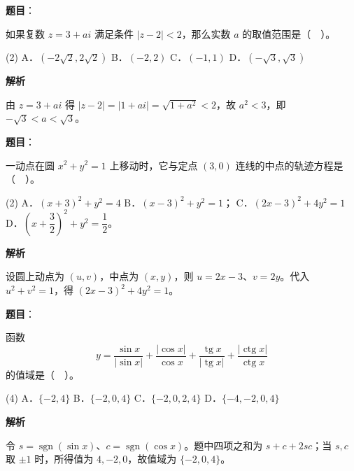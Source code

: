 \begin{answer}

\textbf{题目}：

如果复数 $z=3+ai$ 满足条件 $|z-2|<2$，那么实数 $a$ 的取值范围是（　）。

\begin{gkopts}(2)
\task A．$(-2\sqrt2,2\sqrt2)$
\task B．$(-2,2)$
\task C．$(-1,1)$
\task D．$(-\sqrt3,\sqrt3)$
\end{gkopts}

\textbf{解析}

由 $z=3+ai$ 得 $|z-2|=|1+ai|=\sqrt{1+a^2}<2$，故 $a^2<3$，即 $-\sqrt3<a<\sqrt3$。


\end{answer}
\begin{answer}

\textbf{题目}：

一动点在圆 $x^2+y^2=1$ 上移动时，它与定点 $(3,0)$ 连线的中点的轨迹方程是（　）。

\begin{gkopts}(2)
\task A．$(x+3)^2+y^2=4$
\task B．$(x-3)^2+y^2=1$；
\task C．$(2x-3)^2+4y^2=1$
\task D．$\left(x+\dfrac32\right)^2+y^2=\dfrac12$。
\end{gkopts}

\textbf{解析}

设圆上动点为 $(u,v)$，中点为 $(x,y)$，则 $u=2x-3$、$v=2y$。代入 $u^2+v^2=1$，得 $(2x-3)^2+4y^2=1$。


\end{answer}
\begin{answer}

\textbf{题目}：

函数
\nopagebreak[4]
\[
y=\frac{\sin x}{|\sin x|}+\frac{|\cos x|}{\cos x}+\frac{\operatorname{tg}x}{|\operatorname{tg}x|}+\frac{|\operatorname{ctg}x|}{\operatorname{ctg}x}
\]
的值域是（　）。

\begin{gkopts}(4)
\task A．$\{-2,4\}$
\task B．$\{-2,0,4\}$
\task C．$\{-2,0,2,4\}$
\task D．$\{-4,-2,0,4\}$
\end{gkopts}

\textbf{解析}

令 $s=\operatorname{sgn}(\sin x)$、$c=\operatorname{sgn}(\cos x)$。题中四项之和为 $s+c+2sc$；当 $s,c$ 取 $\pm1$ 时，所得值为 $4,-2,0$，故值域为 $\{-2,0,4\}$。


\end{answer}
